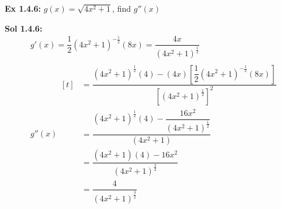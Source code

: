 \begin{tcolorbox}[example]
    \textbf{Ex 1.4.6: } $g(x) = \sqrt{4x^2 + 1}$, find $g''(x)$
\end{tcolorbox}
\begin{tcolorbox}[solution]
    \textbf{Sol 1.4.6: } \begin{align*}
        & g'(x) = \dfrac{1}{2}\left(4x^2 + 1\right)^{-\frac{1}{2}}(8x) = \dfrac{4x}{\left(4x^2 + 1\right)^{\frac{1}{2}}} \\[11pt]
        & g''(x) \begin{aligned}[t]
            & = \dfrac{\left(4x^2 + 1\right)^{\frac{1}{2}}(4) - (4x)\left[\dfrac{1}{2}\left(4x^2 + 1\right)^{-\frac{1}{2}}(8x)\right]}{\left[\left(4x^2 + 1\right)^{\frac{1}{2}}\right]^2} \\[11pt]
            & = \dfrac{{\left(4x^2 + 1\right)^{\frac{1}{2}}}(4) - \dfrac{16x^2}{\left(4x^2 + 1\right)^{\frac{1}{2}}}}{\left(4x^2 + 1\right)} \\[11pt]
            & = \dfrac{\left(4x^2 + 1\right)(4) - 16x^2}{\left(4x^2 + 1\right)^{\frac{3}{2}}} \\[11pt]
            & = \boxed{\dfrac{4}{\left(4x^2 + 1\right)^{\frac{3}{2}}}}
        \end{aligned}
    \end{align*}
\end{tcolorbox}